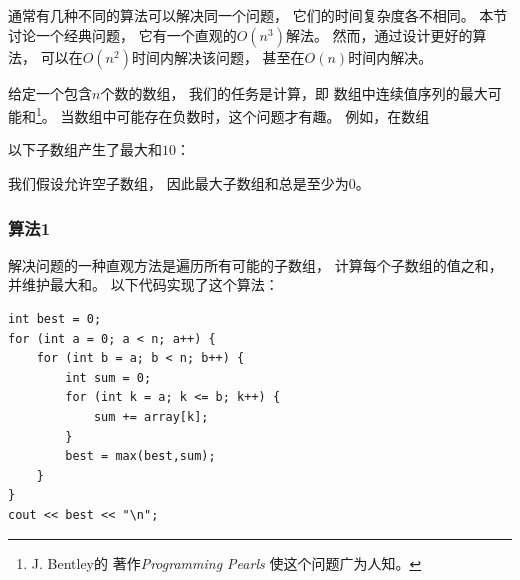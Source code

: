 
通常有几种不同的算法可以解决同一个问题，
它们的时间复杂度各不相同。
本节讨论一个经典问题，
它有一个直观的$O(n^3)$解法。
然而，通过设计更好的算法，
可以在$O(n^2)$时间内解决该问题，
甚至在$O(n)$时间内解决。

给定一个包含$n$个数的数组，
我们的任务是计算，即
数组中连续值序列的最大可能和\footnote{J. Bentley的
著作\emph{Programming Pearls} \cite{ben86}使这个问题广为人知。}。
当数组中可能存在负数时，这个问题才有趣。
例如，在数组
\begin{center}
\end{center}
\begin{samepage}
以下子数组产生了最大和$10$：
\begin{center}
\end{center}
\end{samepage}

我们假设允许空子数组，
因此最大子数组和总是至少为$0$。

\subsubsection{算法1}

解决问题的一种直观方法是遍历所有可能的子数组，
计算每个子数组的值之和，并维护最大和。
以下代码实现了这个算法：

\begin{lstlisting}
int best = 0;
for (int a = 0; a < n; a++) {
    for (int b = a; b < n; b++) {
        int sum = 0;
        for (int k = a; k <= b; k++) {
            sum += array[k];
        }
        best = max(best,sum);
    }
}
cout << best << "\n";
\end{lstlisting}

